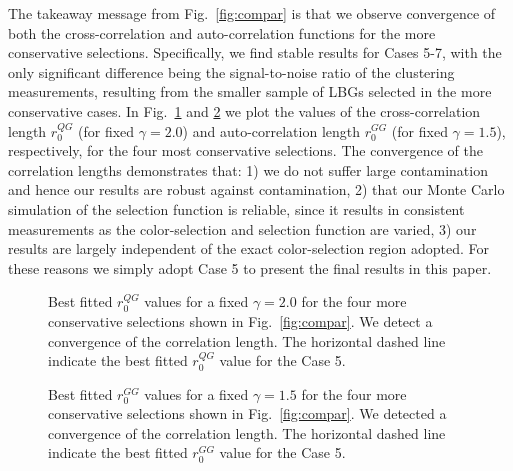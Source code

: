 \documentclass[iop, revtex4]{emulateapj}
\begin{document}
The takeaway message from Fig.~\ref{fig:compar} is that we observe
convergence of both the cross-correlation and auto-correlation
functions for the more conservative selections.  Specifically, we find
stable results for Cases 5-7, with the only significant difference
being the signal-to-noise ratio of the clustering measurements,
resulting from the smaller sample of LBGs selected in the more
conservative cases.  In Fig.~\ref{fig:r0_values} and
\ref{fig:r0_values_auto} we plot the values of the
cross-correlation length $r^{QG}_{0}$ (for fixed $\gamma=2.0$) and
auto-correlation length $r^{GG}_{0}$ (for fixed $\gamma=1.5$),
respectively, for the four most conservative selections. The convergence of the
correlation lengths demonstrates that: 1) we do not suffer
large contamination and hence our results are robust against contamination, 2) that our Monte Carlo
simulation of the selection function is reliable, since it results in consistent
measurements as the color-selection and selection function are varied, 3) our results are largely
independent of the exact color-selection region adopted. For these reasons
we simply adopt Case 5 to present the final results in this paper.

\begin{figure}[t!]
\begin{center}
\caption{\label{fig:r0_values} Best fitted $r^{QG}_{0}$ values for a fixed $\gamma=2.0$ for the four more conservative selections shown in Fig.~\ref{fig:compar}. We detect a convergence of the correlation length. The horizontal dashed line indicate the best fitted $r^{QG}_{0}$ value for the Case 5. \\}  
\end{center}
\end{figure} 

\begin{figure}[t!]
\begin{center}
\caption{\label{fig:r0_values_auto} Best fitted $r^{GG}_{0}$ values for a fixed $\gamma=1.5$ for the four more conservative selections shown in Fig.~\ref{fig:compar}. We detected a convergence of the correlation length. The horizontal dashed line indicate the best fitted $r^{GG}_{0}$ value for the Case 5.\\}  
\end{center}
\end{figure} 
\end{document}
